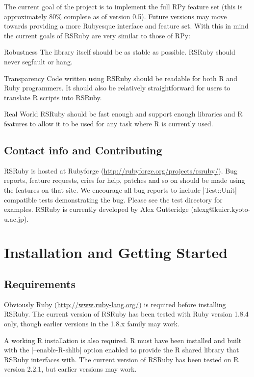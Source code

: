 \documentclass[a4paper,12pt]{book}
\newenvironment{TabularDescription}[1]
  {\begin{list}{}%
    {\renewcommand\makelabel[1]{##1:\hfill}%
     \settowidth\labelwidth{\makelabel{#1}}%
     \setlength\leftmargin{\labelwidth+\labelsep}}}%
  {\end{list}}
\begin{document}
The current goal of the project is to implement the full RPy feature set (this is approximately 80\% complete as of version 0.5). Future versions may move towards providing a more Rubyesque interface and feature set. With this in mind the current goals of RSRuby are very similar to those of RPy:

\begin{TabularDescription}{Transparency}
\item[Robustness] The library itself should be as stable as possible. RSRuby should never segfault or hang.
\item[Transparency] Code written using RSRuby should be readable for both R and Ruby programmers. It should also be relatively straightforward for users to translate R scripts into RSRuby.
\item[Real World] RSRuby should be fast enough and support enough libraries and R features to allow it to be used for any task where R is currently used.
\end{TabularDescription}

\section{Contact info and Contributing}

RSRuby is hosted at Rubyforge (\url{http://rubyforge.org/projects/rsruby/}). Bug reports, feature requests, cries for help, patches and so on should be made using the features on that site. We encourage all bug reports to include |Test::Unit| compatible tests demonstrating the bug. Please see the test directory for examples. RSRuby is currently developed by Alex Gutteridge (alexg@kuicr.kyoto-u.ac.jp).

\chapter{Installation and Getting Started}

\section{Requirements}

Obviously Ruby (\url{http://www.ruby-lang.org/}) is required before installing RSRuby. The current version of RSRuby has been tested with Ruby version 1.8.4 only, though earlier versions in the 1.8.x family may work.

A working R installation is also required. R must have been installed and built with the |--enable-R-shlib| option enabled to provide the R shared library that RSRuby interfaces with. The current version of RSRuby has been tested on R version 2.2.1, but earlier versions may work.
\end{document}
